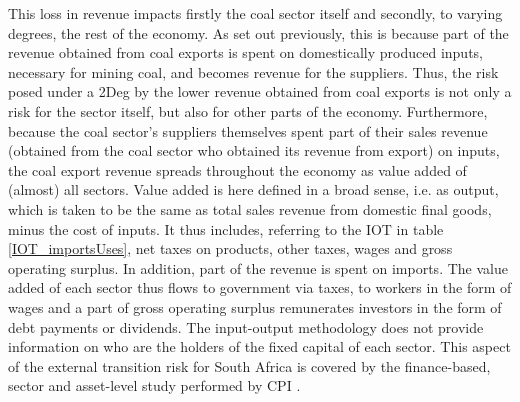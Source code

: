 \documentclass[12pt,english]{article}
\begin{document}
This loss in revenue impacts firstly the coal sector itself and secondly, to varying degrees, the rest of the economy. As set out previously, this is because part of the revenue obtained from coal exports is spent on domestically produced inputs, necessary for mining coal, and becomes revenue for the suppliers. Thus, the risk posed under a 2Deg by the lower revenue obtained from coal exports is not only a risk for the sector itself, but also for other parts of the economy. Furthermore, because the coal sector's suppliers themselves spent part of their sales revenue (obtained from the coal sector who obtained its revenue from export) on inputs, the coal export revenue spreads throughout the economy as value added of (almost) all sectors. Value added is here defined in a broad sense, i.e. as output, which is taken to be the same as total sales revenue from domestic final goods, minus the cost of inputs. It thus includes, referring to the IOT in table \ref{IOT_importsUses}, net taxes on products, other taxes, wages and gross operating surplus. In addition, part of the revenue is spent on imports. The value added of each sector thus flows to government via taxes, to workers in the form of wages and a part of gross operating surplus remunerates investors in the form of debt payments or dividends. 
The input-output methodology does not provide information on who are the holders of the fixed capital of each sector. This aspect of the external transition risk for South Africa is covered by the finance-based, sector and asset-level study performed by CPI \citep{CPI2019SA}. 
\end{document}
